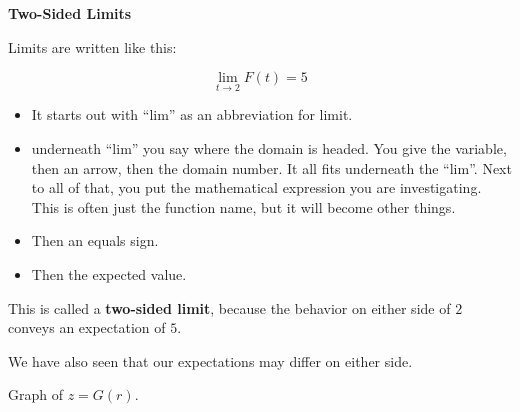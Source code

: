 \documentclass{ximera}
\begin{document}
\begin{notation} \textbf{\textcolor{red!50!green}{Two-Sided Limits}} 

Limits are written like this:

\textbf{\textcolor{red!70!black}{
\[   \lim\limits_{t \to 2} F(t) = 5\]
}}



\begin{itemize}
\item It starts out with ``lim'' as an abbreviation for limit.
\item underneath ``lim'' you say where the domain is headed.  You give the variable, then an arrow, then the domain number.  It all fits underneath the ``lim''.
\tem Next to all of that, you put the mathematical expression you are investigating.  This is often just the function name, but it will become other things.
\item Then an equals sign.
\item Then the expected value.

\end{itemize}


\end{notation}



This is called a \textbf{\textcolor{purple!85!blue}{two-sided limit}}, because the behavior on either side of $2$ conveys an expectation of $5$. 





We have also seen that our expectations may differ on either side. 







Graph of $z = G(r)$.

\begin{image}
\end{image}
\end{document}
